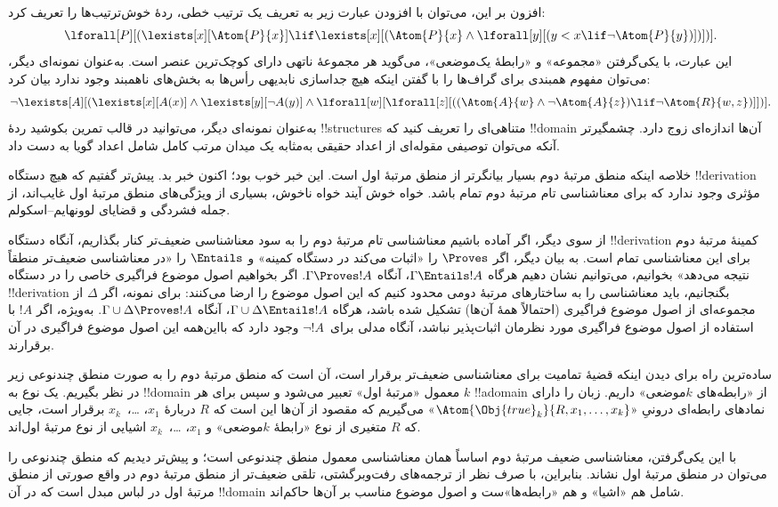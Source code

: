 \documentclass[../../../include/open-logic-section]{subfiles}
\begin{document}
افزون بر این، می‌توان با افزودن عبارت زیر به تعریف یک ترتیب خطی، ردهٔ
خوش‌ترتیب‌ها را تعریف کرد:
\[
\lforall[P][(\lexists[x][\Atom{P}{x}] \lif \lexists[x][(\Atom{P}{x}
    \land \lforall[y][(y < x \lif \lnot \Atom{P}{y})])])].
\]
این عبارت، با یکی‌گرفتن «مجموعه» و «رابطهٔ یک‌موضعی»، می‌گوید هر
مجموعهٔ ناتهی دارای کوچک‌ترین عنصر است. به‌عنوان نمونه‌ای دیگر، می‌توان
مفهوم همبندی برای گراف‌ها را با گفتن اینکه هیچ جداسازی نابدیهی رأس‌ها
به بخش‌های ناهمبند وجود ندارد بیان کرد:
\[
\lnot \lexists[A][(\lexists[x][A(x)] \land \lexists[y][\lnot A(y)]
  \land \lforall[w][\lforall[z][((\Atom{A}{w} \land \lnot \Atom{A}{z})
      \lif \lnot \Atom{R}{w,z})]])].
\]
به‌عنوان نمونه‌ای دیگر، می‌توانید در قالب تمرین بکوشید ردهٔ
!!{structure}s متناهی‌ای را تعریف کنید که !!{domain} آن‌ها اندازه‌ای
زوج دارد. چشمگیرتر آنکه می‌توان توصیفی مقوله‌ای از اعداد حقیقی به‌مثابه
یک میدان مرتب کامل شامل اعداد گویا به دست داد.

خلاصه اینکه منطق مرتبهٔ دوم بسیار بیانگرتر از منطق مرتبهٔ اول است. این
خبر خوب بود؛ اکنون خبر بد. پیش‌تر گفتیم که هیچ دستگاه !!{derivation}
مؤثری وجود ندارد که برای معناشناسی تام مرتبهٔ دوم تمام باشد. خواه خوش
آیند خواه ناخوش، بسیاری از ویژگی‌های منطق مرتبهٔ اول غایب‌اند، از جمله
فشردگی و قضایای لوونهایم--اسکولم.

از سوی دیگر، اگر آماده باشیم معناشناسی تام مرتبهٔ دوم را به سود
معناشناسی ضعیف‌تر کنار بگذاریم، آنگاه دستگاه !!{derivation} کمینهٔ
مرتبهٔ دوم برای این معناشناسی تمام است. به بیان دیگر، اگر $\Proves$ را
«اثبات می‌کند در دستگاه کمینه» و $\Entails$ را «در معناشناسی ضعیف‌تر
منطقاً نتیجه می‌دهد» بخوانیم، می‌توانیم نشان دهیم هرگاه
$\Gamma \Entails !A$، آنگاه $\Gamma \Proves !A$. اگر بخواهیم اصول
موضوع فراگیری خاصی را در دستگاه !!{derivation} بگنجانیم، باید معناشناسی
را به ساختارهای مرتبهٔ دومی محدود کنیم که این اصول موضوع را ارضا
می‌کنند: برای نمونه، اگر $\Delta$ از مجموعه‌ای از اصول موضوع فراگیری
(احتمالاً همهٔ آن‌ها) تشکیل شده باشد، هرگاه
$\Gamma \cup \Delta \Entails !A$، آنگاه
$\Gamma \cup \Delta \Proves !A$. به‌ویژه، اگر $!A$ با استفاده از اصول
موضوع فراگیری مورد نظرمان اثبات‌پذیر نباشد، آنگاه مدلی برای~$\lnot !A$
وجود دارد که بااین‌همه این اصول موضوع فراگیری در آن برقرارند.

ساده‌ترین راه برای دیدن اینکه قضیهٔ تمامیت برای معناشناسی ضعیف‌تر
برقرار است، آن است که منطق مرتبهٔ دوم را به صورت منطق چندنوعی زیر در
نظر بگیریم. یک نوع به !!{domain} معمول «مرتبهٔ اول» تعبیر می‌شود و سپس
برای هر $k$ !!a{domain} از «رابطه‌های $k$موضعی» داریم. زبان را دارای
نمادهای رابطه‌ای درونیِ «$\Atom{\Obj{true}_k}{R,x_1,\dots,x_k}$»
می‌گیریم که مقصود از آن‌ها این است که $R$ دربارهٔ $x_1$، \dots،~$x_k$
برقرار است، جایی که $R$ متغیری از نوع «رابطهٔ $k$موضعی» و
$x_1$، \dots،~$x_k$ اشیایی از نوع مرتبهٔ اول‌اند.

با این یکی‌گرفتن، معناشناسی ضعیف مرتبهٔ دوم اساساً همان معناشناسی معمول
منطق چندنوعی است؛ و پیش‌تر دیدیم که منطق چندنوعی را می‌توان در منطق
مرتبهٔ اول نشاند. بنابراین، با صرف نظر از ترجمه‌های رفت‌وبرگشتی، تلقی
ضعیف‌تر از منطق مرتبهٔ دوم در واقع صورتی از منطق مرتبهٔ اول در لباس
مبدل است که در آن !!{domain} شامل هم «اشیا» و هم «رابطه‌ها»ست و اصول
موضوع مناسب بر آن‌ها حاکم‌اند.
\end{document}
